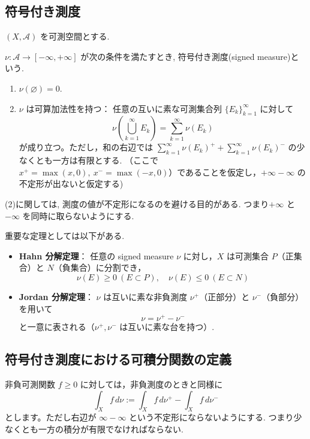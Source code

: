 \subsection*{符号付き測度}
\((X, \mathcal{A})\) を可測空間とする.

\begin{tcolorbox}[mybox]
\begin{defn}
\(\nu : \mathcal{A} \to [-\infty, +\infty]\) が次の条件を満たすとき, 符号付き測度(signed measure)という. 
\begin{enumerate}
    \item \(\nu(\varnothing) = 0\).
    \item \(\nu\) は可算加法性を持つ：
    任意の互いに素な可測集合列 \(\{E_k\}_{k=1}^\infty\) に対して
    \[
    \nu\left( \bigcup_{k=1}^\infty E_k \right) = \sum_{k=1}^\infty \nu(E_k)
    \]
    が成り立つ。ただし，和の右辺では
    \(\sum_{k=1}^\infty \nu(E_k)^+ + \sum_{k=1}^\infty \nu(E_k)^-\) の少なくとも一方は有限とする. 
    （ここで \(x^+ = \max(x,0), \ x^- = \max(-x,0)\)）であることを仮定し，\(+\infty - \infty\) の不定形が出ないと仮定する)
\end{enumerate}
\end{defn}
\end{tcolorbox}
(2)に関しては,  測度の値が不定形になるのを避ける目的がある. つまり\(+\infty\) と \(-\infty\) を同時に取らないようにする. 

重要な定理としては以下がある. 
\begin{itemize}
    \item \textbf{Hahn 分解定理}：  
    任意の signed measure \(\nu\) に対し，\(X\) は可測集合 \(P\)（正集合）と \(N\)（負集合）に分割でき，
    \[
    \nu(E) \ge 0 \ (E \subset P), \quad \nu(E) \le 0 \ (E \subset N)
    \]
    \item \textbf{Jordan 分解定理}：  
    \(\nu\) は互いに素な非負測度 \(\nu^+\)（正部分）と \(\nu^-\)（負部分）を用いて
    \[
    \nu = \nu^+ - \nu^-
    \]
    と一意に表される（\(\nu^+, \nu^-\) は互いに素な台を持つ）.
\end{itemize}


\subsection*{符号付き測度における可積分関数の定義}

非負可測関数 \(f \ge 0\) に対しては，非負測度のときと同様に
\[
\int_X f \, d\nu := \int_X f \, d\nu^+ - \int_X f \, d\nu^-
\]
とします。ただし右辺が \(\infty - \infty\) という不定形にならないようにする. つまり少なくとも一方の積分が有限でなければならない. 

